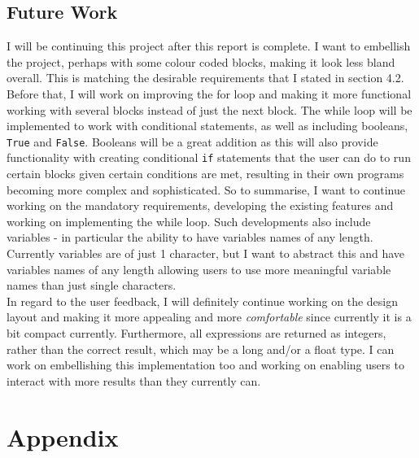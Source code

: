 \documentclass[a4paper, 12pt]{article}
\begin{document}
    \subsection{Future Work}
        I will be continuing this project after this report is complete. I want to embellish
        the project, perhaps with some colour coded blocks, making it look less bland overall.
        This is matching the desirable requirements that I stated in section 4.2. Before that,
        I will work on improving the for loop and making it more functional working with
        several blocks instead of just the next block. The while loop will be implemented
        to work with conditional statements, as well as including booleans, \texttt{True} and
        \texttt{False}. Booleans will be a great addition as this will also provide functionality
        with creating conditional \texttt{if} statements that the user can do to run certain
        blocks given certain conditions are met, resulting in their own programs becoming
        more complex and sophisticated. So to summarise, I want to continue working on the
        mandatory requirements, developing the existing features and working on implementing
        the while loop. Such developments also include variables - in particular the ability
        to have variables names of any length. Currently variables are of just 1 character,
        but I want to abstract this and have variables names of any length allowing users to
        use more meaningful variable names than just single characters. \\

        In regard to the user feedback, I will definitely continue working on the design layout
        and making it more appealing and more \textit{comfortable} since currently it is a bit
        compact currently. Furthermore, all expressions are returned as integers, rather than
        the correct result, which may be a long and/or a float type. I can work on embellishing
        this implementation too and working on enabling users to interact with more results than
        they currently can.

    
    \clearpage
    \section{Appendix}
\end{document}

